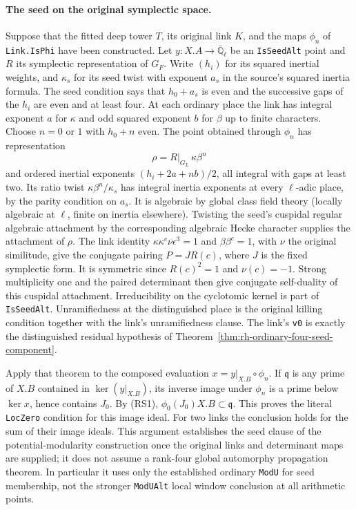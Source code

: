 \paragraph{The seed on the original symplectic space.}
Suppose that the fitted deep tower $T$, its original link $K$,
and the maps $\phi_n$ of \texttt{Link.IsPhi} have been constructed.
Let $y:X.A\to\overline{\mathbb Q}_\ell$ be an \texttt{IsSeedAlt}
point and $R$ its symplectic representation of $G_F$. Write
$(h_i)$ for its squared inertial weights, and $\kappa_s$ for its
seed twist with exponent $a_s$ in the source's squared inertia
formula. The seed condition says that $h_0+a_s$ is even and the
successive gaps of the $h_i$ are even and at least four. At each
ordinary place the link has integral exponent $a$ for $\kappa$
and odd squared exponent $b$ for $\beta$ up to finite characters.
Choose $n=0$ or $1$ with $h_0+n$ even. The point obtained through
$\phi_n$ has representation
\[
                 \rho=R|_{G_L}\,\kappa\beta^n
\]
and ordered inertial exponents $(h_i+2a+nb)/2$, all integral
with gaps at least two. Its ratio twist
$\kappa\beta^n/\kappa_s$ has integral inertia exponents at
every $\ell$-adic place, by the parity condition on $a_s$.
It is algebraic by global class field theory (locally algebraic
at $\ell$, finite on inertia elsewhere). Twisting the seed's
cuspidal regular algebraic attachment by the corresponding
algebraic Hecke character supplies the attachment of $\rho$.
The link identity $\kappa\kappa^c\nu\epsilon^3=1$ and
$\beta\beta^c=1$, with $\nu$ the original similitude, give the
conjugate pairing $P=J R(c)$, where $J$ is the fixed symplectic
form. It is symmetric since $R(c)^2=1$ and $\nu(c)=-1$.
Strong multiplicity one and the paired determinant then give
conjugate self-duality of this cuspidal attachment.
Irreducibility on the cyclotomic kernel is part of
\texttt{IsSeedAlt}. Unramifiedness at the distinguished place is
the original killing condition together with the link's
unramifiedness clause. The link's \texttt{v0} is exactly the
distinguished residual hypothesis of
Theorem~\ref{thm:rh-ordinary-four-seed-component}.

Apply that theorem to the composed evaluation
$x=y|_{X.B}\circ\phi_n$. If $\mathfrak q$ is any prime of
$X.B$ contained in $\ker(y|_{X.B})$, its inverse image under
$\phi_n$ is a prime below $\ker x$, hence contains $J_0$.
By (RS1), $\phi_0(J_0)X.B\subset\mathfrak q$. This proves
the literal \texttt{LocZero} condition for this image ideal.
For two links the conclusion holds for the sum of their image
ideals. This argument establishes the seed clause of the
potential-modularity construction once the original links
and determinant maps are supplied; it does not assume a
rank-four global automorphy propagation theorem. In particular
it uses only the established ordinary \texttt{ModU} for
seed membership, not the stronger \texttt{ModUAlt} local
window conclusion at all arithmetic points.
